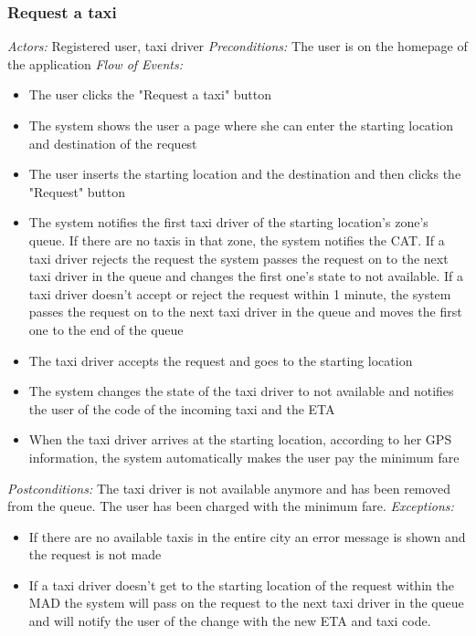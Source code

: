 \documentclass{article}
\begin{document}
\subsubsection{Request a taxi}
\textit{Actors:} Registered user, taxi driver
\textit{Preconditions:} The user is on the homepage of the application %
\textit{Flow of Events:}
	\begin{itemize}
		\item  The user clicks the "Request a taxi" button
		\item  The system shows the user a page where she can enter the starting location and destination of the request
		\item  The user inserts the starting location and the destination and then clicks the "Request" button
		\item  The system notifies the first taxi driver of the starting location's zone's queue. If there are no taxis in that zone, the system notifies the CAT. If a taxi driver rejects the request the system passes the request on to the next taxi driver in the queue and changes the first one's state to not available. If a taxi driver doesn't accept or reject the request within 1 minute, the system passes the request on to the next taxi driver in the queue and moves the first one to the end of the queue
		\item  The taxi driver accepts the request and goes to the starting location
		\item  The system changes the state of the taxi driver to not available and notifies the user of the code of the incoming taxi and the ETA
		\item  When the taxi driver arrives at the starting location, according to her GPS information, the system automatically makes the user pay the minimum fare %
	\end{itemize}
\textit{Postconditions:} The taxi driver is not available anymore and has been removed from the queue. The user has been charged with the minimum fare. %
\textit{Exceptions:}
	\begin{itemize}
		\item If there are no available taxis in the entire city an error message is shown and the request is not made
		\item If a taxi driver doesn't get to the starting location of the request within the MAD the system will pass on the request to the next taxi driver in the queue and will notify the user of the change with the new ETA and taxi code.
	\end{itemize}
	
\end{document}
